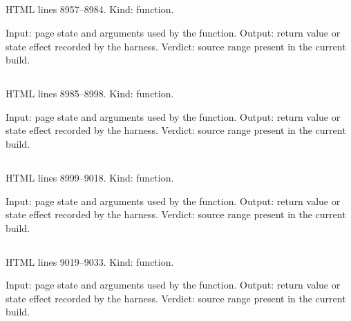 \subsection*{\texttt{}}
\label{vf_490_plateMapRows}
HTML lines 8957--8984. Kind: function.

Input: page state and arguments used by the function.
Output: return value or state effect recorded by the harness.
Verdict: source range present in the current build.

\subsection*{\texttt{}}
\label{vf_491_sampleComparisonRows}
HTML lines 8985--8998. Kind: function.

Input: page state and arguments used by the function.
Output: return value or state effect recorded by the harness.
Verdict: source range present in the current build.

\subsection*{\texttt{}}
\label{vf_492_reviewStatisticsRows}
HTML lines 8999--9018. Kind: function.

Input: page state and arguments used by the function.
Output: return value or state effect recorded by the harness.
Verdict: source range present in the current build.

\subsection*{\texttt{}}
\label{vf_493_replicateReviewRows}
HTML lines 9019--9033. Kind: function.

Input: page state and arguments used by the function.
Output: return value or state effect recorded by the harness.
Verdict: source range present in the current build.


